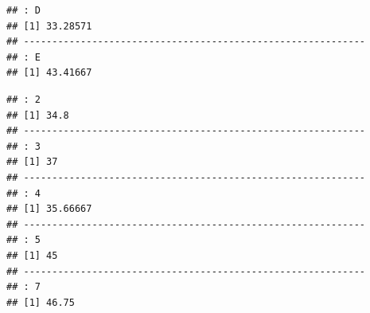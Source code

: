 \documentclass[
]{book}
\newenvironment{Shaded}{\begin{snugshade}}{\end{snugshade}}
\newcommand{\FloatTok}[1]{\textcolor[rgb]{0.00,0.00,0.81}{#1}}
\newcommand{\FunctionTok}[1]{\textcolor[rgb]{0.13,0.29,0.53}{\textbf{#1}}}
\newcommand{\NormalTok}[1]{#1}
\newcommand{\SpecialCharTok}[1]{\textcolor[rgb]{0.81,0.36,0.00}{\textbf{#1}}}
\begin{document}
\begin{verbatim}
## : D
## [1] 33.28571
## ------------------------------------------------------------ 
## : E
## [1] 43.41667
\end{verbatim}

\begin{Shaded}
\end{Shaded}

\begin{verbatim}
## : 2
## [1] 34.8
## ------------------------------------------------------------ 
## : 3
## [1] 37
## ------------------------------------------------------------ 
## : 4
## [1] 35.66667
## ------------------------------------------------------------ 
## : 5
## [1] 45
## ------------------------------------------------------------ 
## : 7
## [1] 46.75
\end{verbatim}

  
\end{document}
